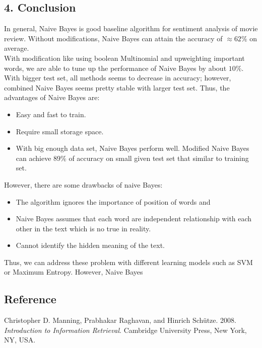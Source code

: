 \documentclass[]{article}
\begin{document}
\subsection{4. Conclusion}\label{Result}
In general, Naive Bayes is good baseline algorithm for sentiment analysis of movie review. Without modifications, Naive Bayes can attain the accuracy of $\approx 62\%$ on average.\\ 
With modification like using boolean Multinomial and upweighting important words, we are able to tune up the performance of Naive Bayes by about $10\%$. With bigger test set, all methods seems to decrease in accuracy; however, combined Naive Bayes seems pretty stable with larger test set. 
Thus, the advantages of Naive Bayes are:
\begin{itemize}
	\item Easy and fast to train.
	\item Require small storage space.
	\item With big enough data set, Naive Bayes perform well. Modified Naive Bayes can achieve 89\% of accuracy on small given test set that similar to training set.
\end{itemize}
However, there are some drawbacks of naive Bayes: 
\begin{itemize}
	\item The algorithm ignores the importance of position of words and 
	\item Naive Bayes assumes that each word are independent relationship with each other in the text which is no true in reality.
	\item Cannot identify the hidden meaning of the text.
\end{itemize}
Thus, we can address these problem with different learning models such as SVM or Maximum Entropy. However, Naive Bayes 
\vfill
\subsection{Reference}\label{Introduction}
Christopher D. Manning, Prabhakar Raghavan, and Hinrich Schütze. 2008. \textit{Introduction to Information Retrieval}. Cambridge University Press, New York, NY, USA.
\end{document}
